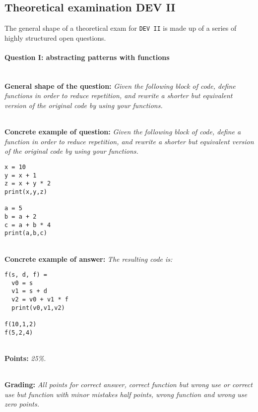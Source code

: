 \subsection{Theoretical examination DEV II}
The general shape of a theoretical exam for \texttt{DEV II} is made up of a series of highly structured open questions.


\paragraph{Question I: abstracting patterns with functions} \ \\

\textbf{General shape of the question:} \textit{Given the following block of code, define functions in order to reduce repetition, and rewrite a shorter but equivalent version of the original code by using your functions.}

\ \\ 

\textbf{Concrete example of question:} \textit{Given the following block of code, define a function in order to reduce repetition, and rewrite a shorter but equivalent version of the original code by using your functions.}

\begin{lstlisting}
x = 10
y = x + 1
z = x + y * 2
print(x,y,z)

a = 5
b = a + 2
c = a + b * 4
print(a,b,c)
\end{lstlisting}

\ \\ 

\textbf{Concrete example of answer:} \textit{The resulting code is:}

\begin{lstlisting}
f(s, d, f) =
  v0 = s
  v1 = s + d
  v2 = v0 + v1 * f
  print(v0,v1,v2)

f(10,1,2) 
f(5,2,4) 
\end{lstlisting}

\ \\ 

\textbf{Points:} \textit{25\%.}

\ \\ 

\textbf{Grading:} \textit{All points for correct answer, correct function but wrong use or correct use but function with minor mistakes half points, wrong function and wrong use zero points.}

\ \\ 

